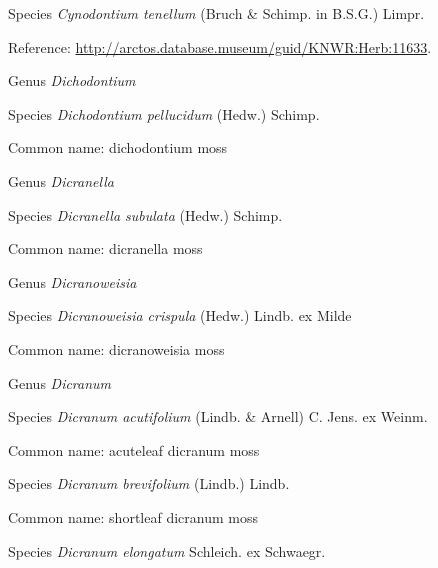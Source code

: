 \documentclass[9pt, article]{memoir}
\begin{document}
\begin{multicols}{2}
\vspace{6pt}\noindent\hspace{36pt}Species \textit{Cynodontium tenellum} (Bruch \& Schimp. in B.S.G.) Limpr.


Reference: 
\url{http://arctos.database.museum/guid/KNWR:Herb:11633}.

\vspace{6pt}\noindent\hspace{30pt}Genus \textit{Dichodontium}


\vspace{6pt}\noindent\hspace{36pt}Species \textit{Dichodontium pellucidum} (Hedw.) Schimp.


Common name: dichodontium moss

\vspace{6pt}\noindent\hspace{30pt}Genus \textit{Dicranella}


\vspace{6pt}\noindent\hspace{36pt}Species \textit{Dicranella subulata} (Hedw.) Schimp.


Common name: dicranella moss

\vspace{6pt}\noindent\hspace{30pt}Genus \textit{Dicranoweisia}


\vspace{6pt}\noindent\hspace{36pt}Species \textit{Dicranoweisia crispula} (Hedw.) Lindb. ex Milde


Common name: dicranoweisia moss

\vspace{6pt}\noindent\hspace{30pt}Genus \textit{Dicranum}


\vspace{6pt}\noindent\hspace{36pt}Species \textit{Dicranum acutifolium} (Lindb. \& Arnell) C. Jens. ex Weinm.


Common name: acuteleaf dicranum moss

\vspace{6pt}\noindent\hspace{36pt}Species \textit{Dicranum brevifolium} (Lindb.) Lindb.


Common name: shortleaf dicranum moss

\vspace{6pt}\noindent\hspace{36pt}Species \textit{Dicranum elongatum} Schleich. ex Schwaegr.



\end{multicols}
\end{document}
